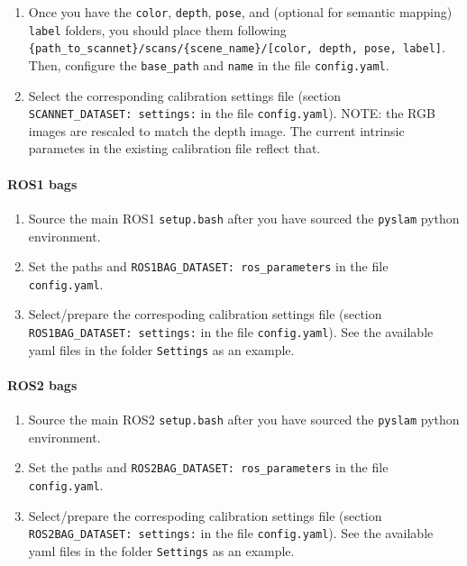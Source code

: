 \documentclass{article}
\providecommand{\tightlist}{%
  \setlength{\itemsep}{0pt}\setlength{\parskip}{0pt}}
\let\oldparagraph\paragraph
\renewcommand{\paragraph}[1]{\oldparagraph{#1}\mbox{}}
\begin{document}
\begin{enumerate}
\def\labelenumi{\arabic{enumi}.}
\setcounter{enumi}{1}
\tightlist
\item
  Once you have the \texttt{color}, \texttt{depth}, \texttt{pose}, and
  (optional for semantic mapping) \texttt{label} folders, you should
  place them following
  \texttt{\{path\_to\_scannet\}/scans/\{scene\_name\}/{[}color,\ depth,\ pose,\ label{]}}.
  Then, configure the \texttt{base\_path} and \texttt{name} in the file
  \texttt{config.yaml}.
\item
  Select the corresponding calibration settings file (section
  \texttt{SCANNET\_DATASET:\ settings:} in the file
  \texttt{config.yaml}). NOTE: the RGB images are rescaled to match the
  depth image. The current intrinsic parametes in the existing
  calibration file reflect that.
\end{enumerate}

\hypertarget{ros1-bags}{%
\paragraph{ROS1 bags}\label{ros1-bags}}

\begin{enumerate}
\def\labelenumi{\arabic{enumi}.}
\tightlist
\item
  Source the main ROS1 \texttt{setup.bash} after you have sourced the
  \texttt{pyslam} python environment.
\item
  Set the paths and \texttt{ROS1BAG\_DATASET:\ ros\_parameters} in the
  file \texttt{config.yaml}.
\item
  Select/prepare the correspoding calibration settings file (section
  \texttt{ROS1BAG\_DATASET:\ settings:} in the file
  \texttt{config.yaml}). See the available yaml files in the folder
  \texttt{Settings} as an example.
\end{enumerate}

\hypertarget{ros2-bags}{%
\paragraph{ROS2 bags}\label{ros2-bags}}

\begin{enumerate}
\def\labelenumi{\arabic{enumi}.}
\tightlist
\item
  Source the main ROS2 \texttt{setup.bash} after you have sourced the
  \texttt{pyslam} python environment.
\item
  Set the paths and \texttt{ROS2BAG\_DATASET:\ ros\_parameters} in the
  file \texttt{config.yaml}.
\item
  Select/prepare the correspoding calibration settings file (section
  \texttt{ROS2BAG\_DATASET:\ settings:} in the file
  \texttt{config.yaml}). See the available yaml files in the folder
  \texttt{Settings} as an example.
\end{enumerate}
\end{document}
